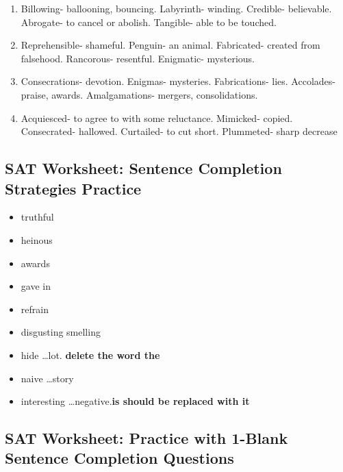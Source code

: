 \begin{enumerate}
\begin{enumerate}

\item Billowing- ballooning, bouncing. Labyrinth- winding. Credible- believable. Abrogate- to cancel or abolish. Tangible- able to be touched.  

\item Reprehensible- shameful. Penguin- an animal. Fabricated- created from falsehood. Rancorous- resentful. Enigmatic- mysterious. 

\item Consecrations- devotion. Enigmas- mysteries. Fabrications- lies. Accolades- praise, awards. Amalgamations- mergers, consolidations.

\item Acquiesced- to agree to with some reluctance. Mimicked- copied. Consecrated- hallowed. Curtailed- to cut short. Plummeted- sharp decrease

\end{enumerate}

\subsection{SAT Worksheet: Sentence Completion Strategies Practice}

\begin{itemize}

\item truthful

\item heinous

\item awards

\item gave in

\item refrain

\item disgusting smelling

\item hide \ldots lot. \textbf{delete the word the}

\item naive \ldots story

\item interesting \ldots negative.\textbf{is should be replaced with it} 

\end{itemize}

\subsection{SAT Worksheet: Practice with 1-Blank Sentence Completion Questions}


\end{enumerate}
